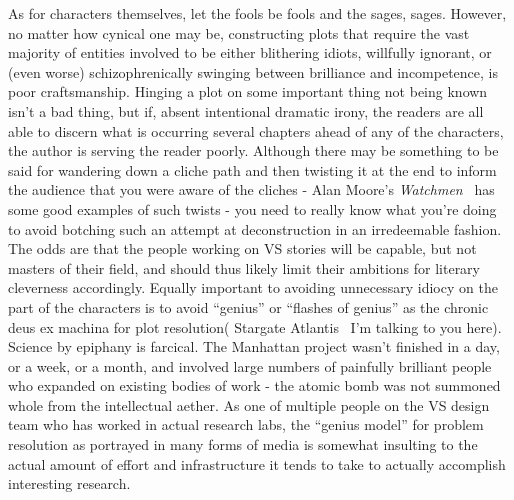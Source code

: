 As for characters themselves, let the fools be fools and the sages,
sages. However, no matter how cynical one may be, constructing plots
that require the vast majority of entities involved to be either
blithering idiots, willfully ignorant, or (even worse)
schizophrenically swinging between brilliance and incompetence, is
poor craftsmanship. Hinging a plot on some important thing not being
known isn't a bad thing, but if, absent intentional dramatic irony,
the readers are all able to discern what is occurring several chapters
ahead of any of the characters, the author is serving the reader
poorly. Although there may be something to be said for wandering down
a cliche path and then twisting it at the end to inform the audience
that you were aware of the cliches - Alan Moore's \emph{
Watchmen}~\cite{Moore-Watchmen} has some good examples of such twists - 
you need to really know what you're doing to avoid botching such an
attempt at deconstruction in an irredeemable fashion. The odds are that
the people working on VS stories will be capable, but not masters of
their field, and should thus likely limit their ambitions for literary
cleverness accordingly. Equally important to avoiding unnecessary
idiocy on the part of the characters is to avoid ``genius'' or
``flashes of genius'' as the chronic deus ex machina for plot
resolution( Stargate Atlantis~\cite{StargateAtlantis} I'm talking to
you here). Science by epiphany is farcical. The Manhattan project wasn't finished in a day, or a week,
or a month, and involved large numbers of painfully brilliant people
who expanded on existing bodies of work - the atomic bomb was not
summoned whole from the intellectual aether. As one of multiple people
on the VS design team who has worked in actual research labs, the
``genius model'' for problem resolution as portrayed in many forms of
media is somewhat insulting to the actual amount of effort and
infrastructure it tends to take to actually accomplish interesting
research. 

